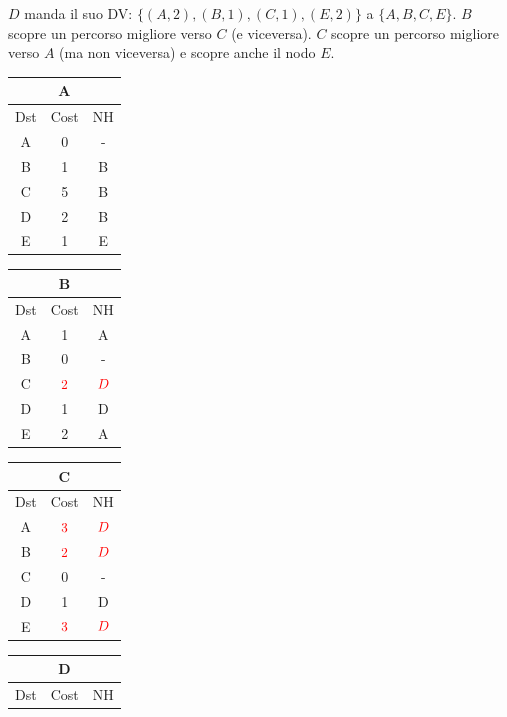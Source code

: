 \documentclass[10pt]{article}
\begin{document}
			\newline \newline
			$D$ manda il suo DV: $\{(A,2),(B,1),(C,1),(E,2)\}$ a $\{A,B,C,E\}$.
			\newline
			$B$ scopre un percorso migliore verso $C$ (e viceversa).
			\newline
			$C$ scopre un percorso migliore verso $A$ (ma non viceversa) e scopre anche il nodo $E$.
			\begin{table}[h!]
				\begin{tabular}{|c||c||c|}
					\hline
					\multicolumn{3}{|c|}{A} \\
					\hline
					Dst & Cost & NH \\
					\hline
					A & 0 & - \\
					B & 1 & B \\
					C & 5 & B \\
					D & 2 & B \\
					E & 1 & E \\
					\hline
				\end{tabular}
				\begin{tabular}{|c||c||c|}
					\hline
					\multicolumn{3}{|c|}{B} \\
					\hline
					Dst & Cost & NH \\
					\hline
					A & 1 & A \\
					B & 0 & - \\
					C & $\color{red} 2$ & $\color{red} D$ \\
					D & 1 & D \\
					E & 2 & A \\
					\hline
				\end{tabular}
				\begin{tabular}{|c||c||c|}
					\hline
					\multicolumn{3}{|c|}{C} \\
					\hline
					Dst & Cost & NH \\
					\hline
					A & $\color{red} 3$ & $\color{red} D$ \\
					B & $\color{red} 2$ & $\color{red} D$ \\
					C & 0 & - \\
					D & 1 & D \\
					E & $\color{red} 3$ & $\color{red} D$ \\
					\hline
				\end{tabular}
				\begin{tabular}{|c||c||c|}
					\hline
					\multicolumn{3}{|c|}{D} \\
					\hline
					Dst & Cost & NH \\

\end{tabular}
\end{table}
\end{document}
